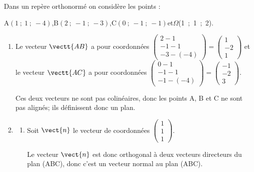 \medskip

Dans un repère orthonormé \Oijk{} on considère les points :
\begin{center} A$(1~;~1~;~-4)$,\quad B$(2~;~-1~;~-3)$,\quad  C$(0~;~-1~;~-1)$\quad  et\quad  $\Omega$(1~;~1~;~2).\end{center}

\smallskip

\begin{enumerate}
\item
Le vecteur $\vectt{AB}$ a pour coordonnées
$\begin{pmatrix}
2-1 \\ -1-1 \\-3-(-4)
\end{pmatrix}
=
\begin{pmatrix}
1 \\ -2 \\ 1
\end{pmatrix}$
 et le vecteur $\vectt{AC}$ a pour coordonnées
$\begin{pmatrix}
0-1 \\ -1-1 \\-1-(-4)
\end{pmatrix}
=
\begin{pmatrix}
-1 \\ -2 \\ 3
\end{pmatrix}$.

Ces deux vecteurs ne sont pas colinéaires, donc les points A, B et C ne sont pas alignés; ils définissent donc un plan.
 
\item 
	\begin{enumerate}
		\item Soit  $\vect{n}$ le vecteur de coordonnées $\begin{pmatrix}1\\1\\1\end{pmatrix}$.
		

Le vecteur $\vect{n}$ est donc orthogonal à deux vecteurs directeurs du plan (ABC), donc c'est un vecteur normal au plan (ABC).
		

\end{enumerate}
\end{enumerate}
